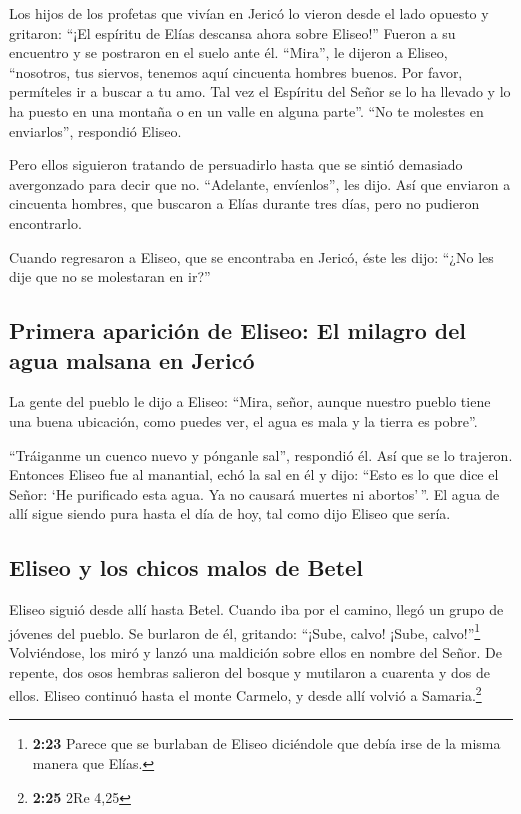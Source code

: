  Los hijos de los profetas que vivían en Jericó lo vieron
desde el lado opuesto y gritaron: ``¡El espíritu de Elías descansa ahora
sobre Eliseo!'' Fueron a su encuentro y se postraron en el suelo ante
él.  ``Mira'', le dijeron a Eliseo, ``nosotros, tus
siervos, tenemos aquí cincuenta hombres buenos. Por favor, permíteles ir
a buscar a tu amo. Tal vez el Espíritu del Señor se lo ha llevado y lo
ha puesto en una montaña o en un valle en alguna parte''. ``No te
molestes en enviarlos'', respondió Eliseo.

 Pero ellos siguieron tratando de persuadirlo hasta que
se sintió demasiado avergonzado para decir que no. ``Adelante,
envíenlos'', les dijo. Así que enviaron a cincuenta hombres, que
buscaron a Elías durante tres días, pero no pudieron encontrarlo.

 Cuando regresaron a Eliseo, que se encontraba en Jericó,
éste les dijo: ``¿No les dije que no se molestaran en ir?''

\hypertarget{primera-apariciuxf3n-de-eliseo-el-milagro-del-agua-malsana-en-jericuxf3}{%
\subsection{Primera aparición de Eliseo: El milagro del agua malsana en
Jericó}\label{primera-apariciuxf3n-de-eliseo-el-milagro-del-agua-malsana-en-jericuxf3}}

 La gente del pueblo le dijo a Eliseo: ``Mira, señor,
aunque nuestro pueblo tiene una buena ubicación, como puedes ver, el
agua es mala y la tierra es pobre''.

 ``Tráiganme un cuenco nuevo y pónganle sal'', respondió
él. Así que se lo trajeron.  Entonces Eliseo fue al
manantial, echó la sal en él y dijo: ``Esto es lo que dice el Señor: `He
purificado esta agua. Ya no causará muertes ni abortos'\,''.
 El agua de allí sigue siendo pura hasta el día de hoy,
tal como dijo Eliseo que sería.

\hypertarget{eliseo-y-los-chicos-malos-de-betel}{%
\subsection{Eliseo y los chicos malos de
Betel}\label{eliseo-y-los-chicos-malos-de-betel}}

 Eliseo siguió desde allí hasta Betel. Cuando iba por el
camino, llegó un grupo de jóvenes del pueblo. Se burlaron de él,
gritando: ``¡Sube, calvo! ¡Sube, calvo!''\footnote{\textbf{2:23} Parece
  que se burlaban de Eliseo diciéndole que debía irse de la misma manera
  que Elías.}  Volviéndose, los miró y lanzó una
maldición sobre ellos en nombre del Señor. De repente, dos osos hembras
salieron del bosque y mutilaron a cuarenta y dos de ellos.
 Eliseo continuó hasta el monte Carmelo, y desde allí
volvió a Samaria.\footnote{\textbf{2:25} 2Re 4,25}

